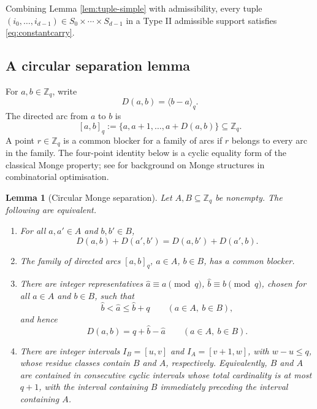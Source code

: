 \documentclass[11pt]{article}
\newtheorem{lemma}[theorem]{Lemma}
\theoremstyle{definition}
\theoremstyle{remark}
\begin{document}
Combining Lemma \ref{lem:tuple-simple} with admissibility, every tuple $(i_0,\ldots,i_{d-1})\in S_0\times\cdots\times S_{d-1}$ in a Type II admissible support satisfies \eqref{eq:constantcarry}.


\subsection{A circular separation lemma}

For $a,b\in\mathbb Z_q$, write
\[
        D(a,b)=\langle b-a\rangle_q .
\]
The directed arc from $a$ to $b$ is
\[
        [a,b]_q:=\{a,a+1,\ldots,a+D(a,b)\}\subseteq\mathbb Z_q .
\]
A point $r\in\mathbb Z_q$ is a common blocker for a family of arcs if $r$ belongs to every arc in the family.
The four-point identity below is a cyclic equality form of the classical Monge property; see \cite{BurkardKlinzRudolf1996} for background on Monge structures in combinatorial optimisation.

\begin{lemma}[Circular Monge separation]
\label{lem:separation}
Let $A,B\subseteq\mathbb Z_q$ be nonempty.  The following are equivalent.
\begin{enumerate}[label=\textup{(\roman*)}]
\item For all $a,a'\in A$ and $b,b'\in B$,
\begin{equation}
        D(a,b)+D(a',b')=D(a,b')+D(a',b).
        \label{eq:monge}
\end{equation}
\item The family of directed arcs $[a,b]_q$, $a\in A$, $b\in B$, has a common blocker.
\item There are integer representatives $\widehat a\equiv a\pmod q$, $\widehat b\equiv b\pmod q$, chosen for all $a\in A$ and $b\in B$, such that
\begin{equation}
        \widehat b<\widehat a\le \widehat b+q
        \qquad(a\in A,\ b\in B),
        \label{eq:separated-lifts-order}
\end{equation}
 and hence
\begin{equation}
        D(a,b)=q+\widehat b-\widehat a
        \qquad(a\in A,\ b\in B).
        \label{eq:separated-lifts-distance}
\end{equation}
\item There are integer intervals $I_B=[u,v]$ and $I_A=[v+1,w]$, with $w-u\le q$, whose residue classes contain $B$ and $A$, respectively.  Equivalently, $B$ and $A$ are contained in consecutive cyclic intervals whose total cardinality is at most $q+1$, with the interval containing $B$ immediately preceding the interval containing $A$.
\end{enumerate}
\end{lemma}
\end{document}
